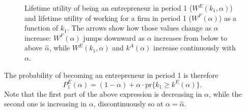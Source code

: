\documentclass[12pt,american]{paper}
\theoremstyle{remark}
\begin{document}
\begin{figure} 
 \centering



\caption{\footnotesize Lifetime utility of being an entrepreneur in period 1 ($W^E(k_1,\alpha)$) and lifetime utility of working for a firm in period 1 ($W^F(\alpha)$) as a function of  $k_1$. The arrows show how those values change as $\alpha$ increase: $W^F(\alpha)$ jumps downward as $\alpha$ increases from below to above $\hat \alpha$, while  $W^E(k_1,\alpha)$ and $k^A(\alpha)$ increase continuously with $\alpha$. } 
\label{fig:effect-labor}
\end{figure}

 The probability of becoming an entrepreneur in period 1 is therefore
 \[
 P^E_1(\alpha) = (1-\alpha) + \alpha \cdot \mbox{pr}\{k_1 \geq k^E (\alpha) \}.
 \]
 Note that the first part of the above expression is decreasing in $\alpha$, while the second one is increasing in $\alpha$, discontinuously so at $\alpha=\hat \alpha$.
 
\end{document}
